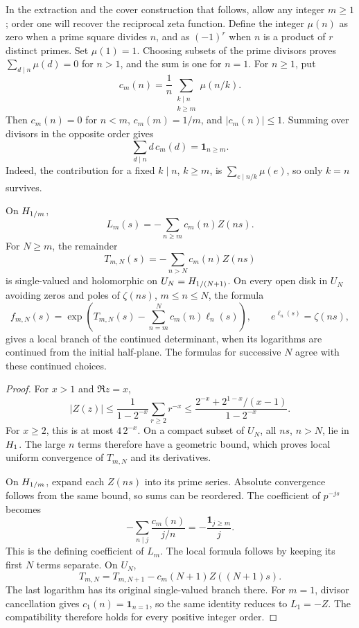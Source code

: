 In the extraction and the cover construction that follows, allow any
integer \(m\geq1\); order one will recover the reciprocal zeta function.
Define the integer \(\mu(n)\) as zero when a prime square divides \(n\),
and as \((-1)^r\) when \(n\) is a product of \(r\) distinct primes.
Set \(\mu(1)=1\).  Choosing subsets of the prime divisors proves
\(\sum_{d\mid n}\mu(d)=0\) for \(n>1\), and the sum is one for \(n=1\).
For \(n\geq1\), put
\[
 c_m(n)=\frac1n\sum_{\substack{k\mid n\\ k\geq m}}\mu(n/k).
\]
Then \(c_m(n)=0\) for \(n<m\), \(c_m(m)=1/m\), and
\(|c_m(n)|\leq1\).  Summing over divisors in the opposite order gives
\[
 \sum_{d\mid n}d\,c_m(d)=\mathbf1_{n\geq m}.
\]
Indeed, the contribution for a fixed \(k\mid n\), \(k\geq m\), is
\(\sum_{e\mid n/k}\mu(e)\), so only \(k=n\) survives.

\begin{theorem}
\label{thm:extraction}\label{mono:prop:extraction}
On \(H_{1/m}\),
\[
 L_m(s)=-\sum_{n\geq m}c_m(n)Z(ns).
\]
For \(N\geq m\), the remainder
\[
 T_{m,N}(s)=-\sum_{n>N}c_m(n)Z(ns)
\]
is single-valued and holomorphic on \(U_N=H_{1/(N+1)}\).
On every open disk in \(U_N\) avoiding zeros and poles of
\(\zeta(ns)\), \(m\leq n\leq N\), the formula
\[
 f_{m,N}(s)=\exp\left(T_{m,N}(s)
       -\sum_{n=m}^N c_m(n)\ell_n(s)\right),
 \qquad e^{\ell_n(s)}=\zeta(ns),
\]
gives a local branch of the continued determinant, when its logarithms
are continued from the initial half-plane.
The formulas for successive \(N\) agree with these continued choices.
\end{theorem}

\begin{proof}
For \(x>1\) and \(\Re z=x\),
\[
 |Z(z)|\leq\frac1{1-2^{-x}}\sum_{r\geq2}r^{-x}
 \leq\frac{2^{-x}+2^{1-x}/(x-1)}{1-2^{-x}}.
\]
For \(x\geq2\), this is at most \(4\,2^{-x}\).
On a compact subset of \(U_N\), all \(ns\), \(n>N\), lie in
\(H_1\).  The large \(n\) terms therefore have a geometric bound,
which proves local uniform convergence of \(T_{m,N}\) and its derivatives.

On \(H_{1/m}\), expand each \(Z(ns)\) into its prime series.
Absolute convergence follows from the same bound, so sums can be reordered.
The coefficient of \(p^{-js}\) becomes
\[
 -\sum_{n\mid j}\frac{c_m(n)}{j/n}
 =-\frac{\mathbf1_{j\geq m}}j.
\]
This is the defining coefficient of \(L_m\).
The local formula follows by keeping its first \(N\) terms separate.
On \(U_N\),
\[
 T_{m,N}=T_{m,N+1}-c_m(N+1)Z((N+1)s).
\]
The last logarithm has its original single-valued branch there.
For \(m=1\), divisor cancellation gives
\(c_1(n)=\mathbf1_{n=1}\), so the same identity reduces to
\(L_1=-Z\).  The compatibility therefore holds for every positive
integer order.
\end{proof}

